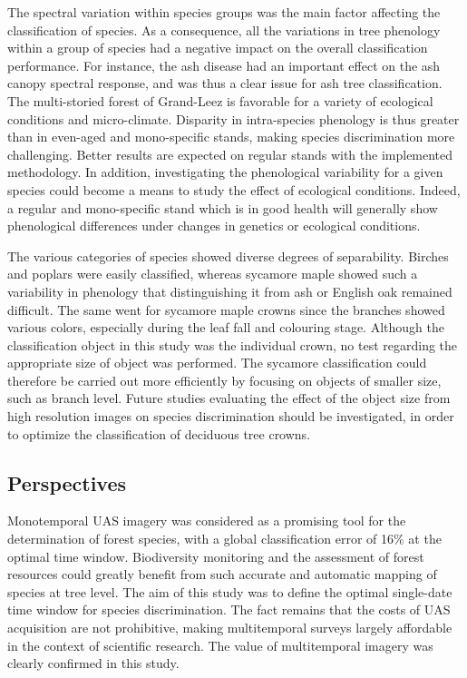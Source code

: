 \documentclass[remotesensing,article,submit,moreauthors,pdftex,12pt,a4paper]{mdpi} %
\begin{document}
The spectral variation within species groups was the main factor affecting the classification of species. 
As a consequence, all the variations in tree phenology within a group of species had a negative impact on the overall classification performance. 
For instance, the ash disease had an important effect on the ash canopy spectral response, and was thus a clear issue for ash tree classification. 
The multi-storied forest of Grand-Leez is favorable for a variety of ecological conditions and micro-climate. 
Disparity in intra-species phenology is thus greater than in even-aged and mono-specific stands, making species discrimination more challenging. 
Better results are expected on regular stands with the implemented methodology. 
In addition, investigating the phenological variability for a given species could become a means to study the effect of ecological conditions. 
Indeed, a regular and mono-specific stand which is in good health will generally show phenological differences under changes in genetics or ecological conditions.

The various categories of species showed diverse degrees of separability. 
Birches and poplars were easily classified, whereas sycamore maple showed such a variability in phenology that distinguishing it from ash or English oak remained difficult. 
The same went for sycamore maple crowns since the branches showed various colors, especially during the leaf fall and colouring stage. 
Although the classification object in this study was the individual crown, no test regarding the appropriate size of object was performed. 
The sycamore classification could therefore be carried out more efficiently by focusing on objects of smaller size, such as branch level. 
Future studies evaluating the effect of the object size from high resolution images on species discrimination should be investigated, in order to optimize the classification of deciduous tree crowns.


\subsection{Perspectives}

Monotemporal UAS imagery was considered as a promising tool for the determination of forest species, with a global classification error of 16\% at the optimal time window. 
Biodiversity monitoring and the assessment of forest resources could greatly benefit from such accurate and automatic mapping of species at tree level. 
The aim of this study was to define the optimal single-date time window for species discrimination. 
The fact remains that the costs of UAS acquisition are not prohibitive, making multitemporal surveys largely affordable in the context of scientific research. 
The value of multitemporal imagery was clearly confirmed in this study.
\end{document}
